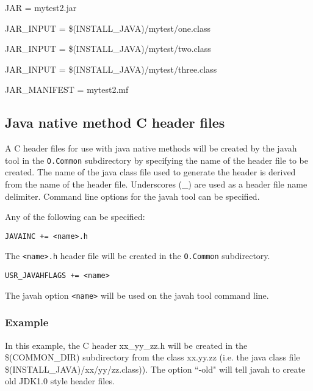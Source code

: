 \begin{description}

\item JAR = mytest2.jar

\item JAR\_INPUT = \$(INSTALL\_JAVA)/mytest/one.class

\item JAR\_INPUT = \$(INSTALL\_JAVA)/mytest/two.class

\item JAR\_INPUT = \$(INSTALL\_JAVA)/mytest/three.class

\item JAR\_MANIFEST = mytest2.mf

\end{description}

\subsection{Java native method C header files}

A C header files for use with java native methods will be created by the javah tool in the \verb|O.Common| subdirectory by 
specifying the name of the header file to be created. The name of the java class file used to generate the header is derived 
from the name of the header file. Underscores (\_) are used as a header file name delimiter. Command line options for the 
javah tool can be specified.

Any of the following can be specified:

\begin{description}

\item {}\verb|JAVAINC += <name>.h|

The \verb|<name>.h| header file will be created in the \verb|O.Common| subdirectory.

\item {}\verb|USR_JAVAHFLAGS += <name>|

The javah option \verb|<name>| will be used on the javah tool command line.

\end{description}

\subsubsection{Example}

In this example, the C header xx\_yy\_zz.h will be created in the \$(COMMON\_DIR) subdirectory from the class xx.yy.zz 
(i.e. the java class file \$(INSTALL\_JAVA)/xx/yy/zz.class)). The option ``-old" will tell javah to create old JDK1.0 style 
header files.

